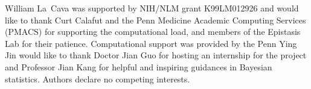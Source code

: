 \documentclass{article}
\begin{document}





\begin{ack}

    William La~Cava was supported by NIH/NLM grant K99LM012926 and would like to thank Curt Calafut and the Penn Medicine Academic Computing Services (PMACS) for supporting the computational load, and members of the Epistasis Lab for their patience.   
    Computational support was provided by the Penn 
    Ying Jin would like to thank Doctor Jian Guo for hosting an internship for the project and Professor Jian Kang for helpful and inspiring guidances in Bayesian statistics.
    Authors declare no competing interests. 
\end{ack}
\end{document}
